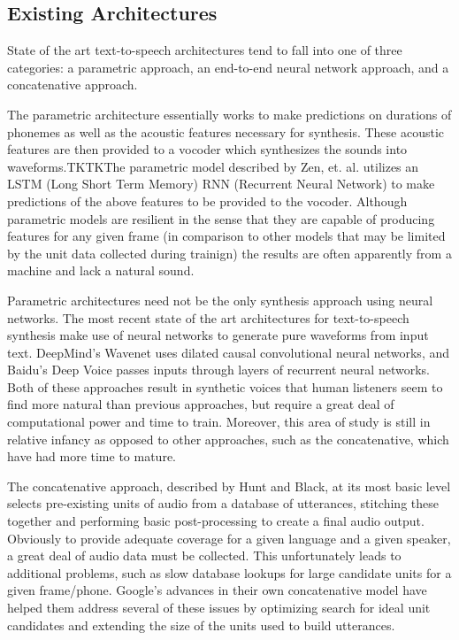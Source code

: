 \documentclass[10pt,a4paper,twocolumn]{article}
\begin{document}
\subsection{Existing Architectures}
State of the art text-to-speech architectures tend to fall into one of three categories: a parametric approach, an end-to-end neural network approach, and a concatenative approach.\par
The parametric architecture essentially works to make predictions on durations of phonemes as well as the acoustic features necessary for synthesis. These acoustic features are then provided to a vocoder which synthesizes the sounds into waveforms.TKTKThe parametric model described by Zen, et. al. utilizes an LSTM (Long Short Term Memory) RNN (Recurrent Neural Network) to make predictions of the above features to be provided to the vocoder.\cite{DBLP:journals/corr/ZenAEHS16} Although parametric models are resilient in the sense that they are capable of producing features for any given frame (in comparison to other models that may be limited by the unit data collected during trainign) the results are often apparently from a machine and lack a natural sound.\par
Parametric architectures need not be the only synthesis approach using neural networks. The most recent state of the art architectures for text-to-speech synthesis make use of neural networks to generate pure waveforms from input text. DeepMind's Wavenet uses dilated causal convolutional neural networks\cite{DBLP:journals/corr/ArikCCDGKLMRSS17}, and Baidu's Deep Voice passes inputs through layers of recurrent neural networks. Both of these approaches result in synthetic voices that human listeners seem to find more natural than previous approaches\cite{DBLP:journals/corr/OordDZSVGKSK16}, but require a great deal of computational power and time to train. Moreover, this area of study is still in relative infancy as opposed to other approaches, such as the concatenative, which have had more time to mature.\par
The concatenative approach, described by Hunt and Black, at its most basic level selects pre-existing units of audio from a database of utterances, stitching these together and performing basic post-processing to create a final audio output\cite{Hunt:1996:USC:1256383.1256532}. Obviously to provide adequate coverage for a given language and a given speaker, a great deal of audio data must be collected. This unfortunately leads to additional problems, such as slow database lookups for large candidate units for a given frame/phone. Google's advances in their own concatenative model have helped them address several of these issues by optimizing search for ideal unit candidates and extending the size of the units used to build utterances.\cite{45564}\par
\end{document}
